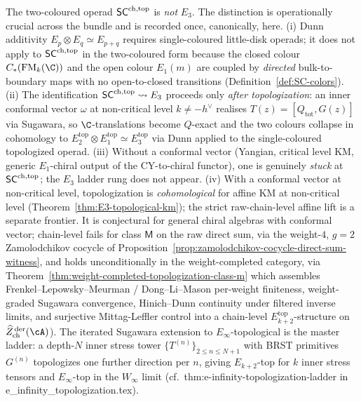 \begin{remark}
\label{rem:sc-not-e3-operadic-guard}%
%
%
%
The two-coloured operad $\mathsf{SC}^{\mathrm{ch},\mathrm{top}}$ is \emph{not} $E_3$. The
distinction is operationally crucial across the bundle and is
recorded once, canonically, here. (i) Dunn additivity
$E_p \otimes E_q \simeq E_{p+q}$ requires single-coloured
little-disk operads; it does not apply to $\mathsf{SC}^{\mathrm{ch},\mathrm{top}}$ in the
two-coloured form because the closed colour
$C_*(\FM_k(\C))$ and the open colour $E_1(m)$ are coupled by
\emph{directed} bulk-to-boundary maps with no open-to-closed
transitions (Definition~\ref{def:SC-colors}). (ii) The
identification $\mathsf{SC}^{\mathrm{ch},\mathrm{top}} \rightsquigarrow E_3$ proceeds only
\emph{after topologization}: an inner conformal vector
$\omega$ at non-critical level $k \neq -h^\vee$ realises
$T(z) = [Q_{\mathrm{tot}}, G(z)]$ via Sugawara, so
$\C$-translations become $Q$-exact and the two colours collapse
in cohomology to $E_2^{\mathrm{top}} \otimes E_1^{\mathrm{top}}
\simeq E_3^{\mathrm{top}}$ via Dunn applied to the
single-coloured topologized operad. (iii) Without a conformal
vector (Yangian, critical level KM, generic $E_1$-chiral
output of the CY-to-chiral functor), one is genuinely
\emph{stuck} at $\mathsf{SC}^{\mathrm{ch},\mathrm{top}}$; the $E_3$ ladder rung does not
appear. (iv) With a conformal vector at non-critical level,
topologization is \emph{cohomological} for affine KM at non-critical
level (Theorem~\ref{thm:E3-topological-km}); the strict raw-chain-level
affine lift is a separate frontier. It is conjectural for general
chiral algebras with conformal vector; chain-level fails for class $\mathsf{M}$
on the raw direct sum, via the weight-$4$, $g = 2$ Zamolodchikov cocycle
of Proposition~\ref{prop:zamolodchikov-cocycle-direct-sum-witness},
and holds unconditionally in the weight-completed category, via
Theorem~\ref{thm:weight-completed-topologization-class-m} which
assembles Frenkel--Lepowsky--Meurman / Dong--Li--Mason per-weight
finiteness, weight-graded Sugawara convergence, Hinich--Dunn
continuity under filtered inverse limits, and surjective
Mittag-Leffler control into a chain-level
$E_{k+2}^{\mathrm{top}}$-structure on
$\widehat{Z}^{\,\mathrm{der}}_{\mathrm{ch}}(\cA)$).
The iterated Sugawara extension to $E_\infty$-topological is
the master ladder: a depth-$N$ inner stress tower
$\{T^{(n)}\}_{2 \le n \le N+1}$ with BRST primitives
$G^{(n)}$ topologizes one further direction per $n$, giving
$E_{k+2}$-top for $k$ inner stress tensors and $E_\infty$-top
in the $W_\infty$ limit (cf.\ thm:e-infinity-topologization-ladder
in \textsf{e\_infinity\_topologization.tex}).
\end{remark}

